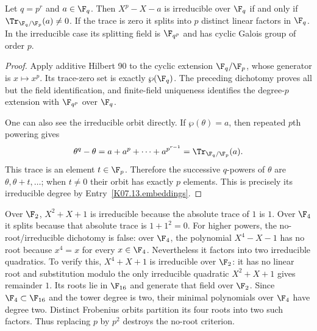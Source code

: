 \begin{theorem}
Let $q=p^r$ and $a\in\F_q$. Then $X^p-X-a$ is irreducible over $\F_q$ if and only if $\Tr_{\F_q/\F_p}(a)\ne0$. If the trace is zero it splits into $p$ distinct linear factors in $\F_q$. In the irreducible case its splitting field is $\F_{q^p}$ and has cyclic Galois group of order $p$.
\end{theorem}
\begin{proof}
Apply additive Hilbert 90 to the cyclic extension $\F_q/\F_p$, whose generator is $x\mapsto x^p$. Its trace-zero set is exactly $\wp(\F_q)$. The preceding dichotomy proves all but the field identification, and finite-field uniqueness identifies the degree-$p$ extension with $\F_{q^p}$ over $\F_q$.

One can also see the irreducible orbit directly. If $\wp(\theta)=a$, then repeated $p$th powering gives
\[\theta^q-\theta=a+a^p+\cdots+a^{p^{r-1}}=\Tr_{\F_q/\F_p}(a).\]
This trace is an element $t\in\F_p$. Therefore the successive $q$-powers of $\theta$ are $\theta,\theta+t,\ldots$; when $t\ne0$ their orbit has exactly $p$ elements. This is precisely its irreducible degree by Entry~\ref{K07.13.embeddings}.
\end{proof}
\begin{example}
Over $\F_2$, $X^2+X+1$ is irreducible because the absolute trace of $1$ is $1$. Over $\F_4$ it splits because that absolute trace is $1+1^2=0$. For higher powers, the no-root/irreducible dichotomy is false: over $\F_4$, the polynomial $X^4-X-1$ has no root because $x^4=x$ for every $x\in\F_4$. Nevertheless it factors into two irreducible quadratics. To verify this, $X^4+X+1$ is irreducible over $\F_2$: it has no linear root and substitution modulo the only irreducible quadratic $X^2+X+1$ gives remainder $1$. Its roots lie in $\F_{16}$ and generate that field over $\F_2$. Since $\F_4\subset\F_{16}$ and the tower degree is two, their minimal polynomials over $\F_4$ have degree two. Distinct Frobenius orbits partition its four roots into two such factors. Thus replacing $p$ by $p^2$ destroys the no-root criterion.
\end{example}

